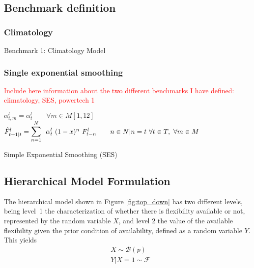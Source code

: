 \subsection{Benchmark definition}
\subsubsection{Climatology}
\begin{algorithm}
	\SetAlgoLined
	
	\caption{Benchmark 1: Climatology Model}
	\label{alg:climatology}
\end{algorithm}


\subsubsection{Single exponential smoothing}
\textcolor{red}{Include here information about the two different benchmarks I have defined: climatology, SES, powertech 1}
\begin{algorithm}
	\SetAlgoLined
	 {
	 $\alpha^{l}_{t,m} = \alpha^{l}_{t} \qquad \forall m \in M[1,12] $
     $\hat{F}^{l}_{t+1|t} = \mathlarger{\mathlarger{\sum}}_{n=1}^{N} \ \ \alpha^{l}_{t} \ (1-x)^{n} \ F^{l}_{t-n} \qquad n \in N | n=t \ \forall t \in T, \ \forall m \in M $
	}
	\caption{Simple Exponential Smoothing (SES)}
	\label{alg:SES}
\end{algorithm}


\subsection{Hierarchical Model Formulation}
The hierarchical model shown in Figure \ref{fig:top_down} has two different levels, being level~1 the characterization of whether there is flexibility available or not, represented by the random variable $X$, and level 2 the value of the available flexibility given the prior condition of availability, defined as a random variable $Y$. This yields
\begin{subequations}
\begin{align} 
\label{eq:hierarchicalpierre}
  & X \sim \mathcal{B}(p) \\
  & Y|X=1 \sim \mathcal{F}
\end{align}
\end{subequations}

